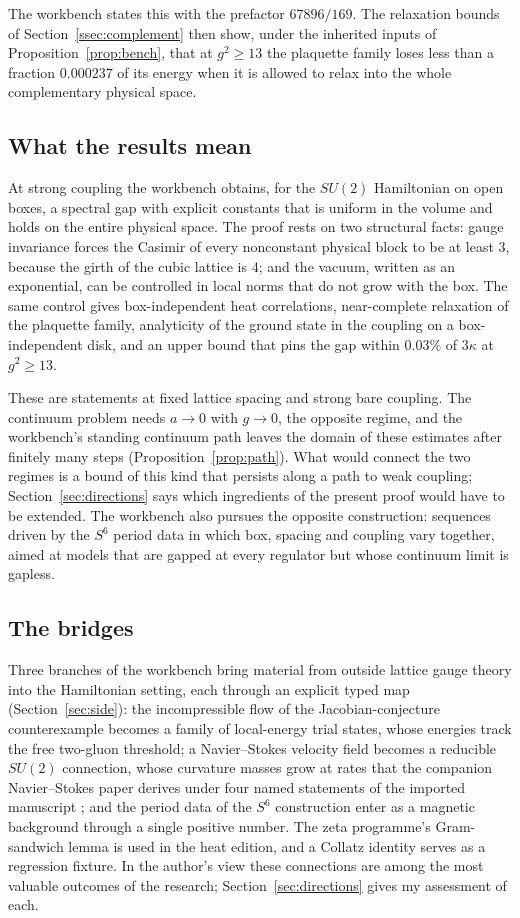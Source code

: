 The workbench states this with the prefactor $67896/169$. The relaxation bounds of Section~\ref{ssec:complement} then show, under the inherited inputs of Proposition~\ref{prop:bench}, that at $g^2\ge13$ the plaquette family loses less than a fraction $0.000237$ of its energy when it is allowed to relax into the whole complementary physical space.

\subsection*{What the results mean}

At strong coupling the workbench obtains, for the $SU(2)$ Hamiltonian on open boxes, a spectral gap with explicit constants that is uniform in the volume and holds on the entire physical space. The proof rests on two structural facts: gauge invariance forces the Casimir of every nonconstant physical block to be at least $3$, because the girth of the cubic lattice is $4$; and the vacuum, written as an exponential, can be controlled in local norms that do not grow with the box. The same control gives box-independent heat correlations, near-complete relaxation of the plaquette family, analyticity of the ground state in the coupling on a box-independent disk, and an upper bound that pins the gap within $0.03\%$ of $3\kappa$ at $g^2\ge13$.

These are statements at fixed lattice spacing and strong bare coupling. The continuum problem needs $a\to0$ with $g\to0$, the opposite regime, and the workbench's standing continuum path leaves the domain of these estimates after finitely many steps (Proposition~\ref{prop:path}). What would connect the two regimes is a bound of this kind that persists along a path to weak coupling; Section~\ref{sec:directions} says which ingredients of the present proof would have to be extended. The workbench also pursues the opposite construction: sequences driven by the $S^6$ period data in which box, spacing and coupling vary together, aimed at models that are gapped at every regulator but whose continuum limit is gapless.

\subsection*{The bridges}

Three branches of the workbench bring material from outside lattice gauge theory into the Hamiltonian setting, each through an explicit typed map (Section~\ref{sec:side}): the incompressible flow of the Jacobian-conjecture counterexample becomes a family of local-energy trial states, whose energies track the free two-gluon threshold; a Navier--Stokes velocity field becomes a reducible $SU(2)$ connection, whose curvature masses grow at rates that the companion Navier--Stokes paper derives under four named statements of the imported manuscript \cite{NSPaper}; and the period data of the $S^6$ construction enter as a magnetic background through a single positive number. The zeta programme's Gram-sandwich lemma is used in the heat edition, and a Collatz identity serves as a regression fixture. In the author's view these connections are among the most valuable outcomes of the research; Section~\ref{sec:directions} gives my assessment of each.

